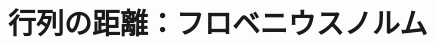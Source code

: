 \documentclass[../../../topic_linear-algebra]{subfiles}
\begin{document}
\sectionline
\section{行列の距離：フロベニウスノルム}

\todo{}
\end{document}
